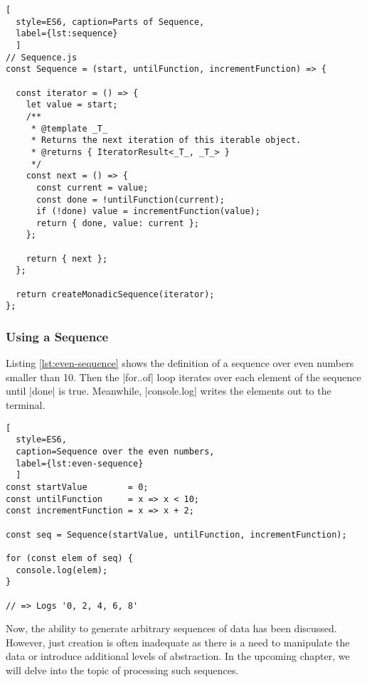 \begin{lstlisting}[
  style=ES6, caption=Parts of Sequence,
  label={lst:sequence}
  ]
// Sequence.js
const Sequence = (start, untilFunction, incrementFunction) => {

  const iterator = () => {
    let value = start;
    /**
     * @template _T_
     * Returns the next iteration of this iterable object.
     * @returns { IteratorResult<_T_, _T_> }
     */
    const next = () => {
      const current = value;
      const done = !untilFunction(current);
      if (!done) value = incrementFunction(value);
      return { done, value: current };
    };

    return { next };
  };

  return createMonadicSequence(iterator);
};
\end{lstlisting}


\subsubsection{Using a Sequence}
\label{subsub:Using a Sequence}
Listing \ref{lst:even-sequence} shows the definition of a sequence over even numbers smaller than 
10. Then the |for..of| loop iterates over each element of the sequence until
|done| is true. Meanwhile, |console.log| writes the elements out to the terminal.

\begin{lstlisting}[
  style=ES6, 
  caption=Sequence over the even numbers,
  label={lst:even-sequence}
  ]
const startValue        = 0;
const untilFunction     = x => x < 10;
const incrementFunction = x => x + 2;

const seq = Sequence(startValue, untilFunction, incrementFunction);

for (const elem of seq) {
  console.log(elem);
}

// => Logs '0, 2, 4, 6, 8'

\end{lstlisting}

Now, the ability to generate arbitrary sequences of data has been discussed. 
However, just creation is often inadequate as there is a need to manipulate the 
data or introduce additional levels of abstraction. In the upcoming chapter, 
we will delve into the topic of processing such sequences.
